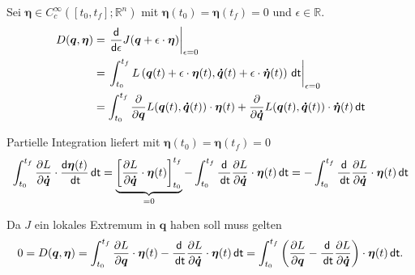 \documentclass[a4paper, 12pt]{scrartcl}
\newcommand{\dt}{\thinspace \mathsf{dt}}
\begin{document}
\begin{beweis}
    Sei $\bm{\eta} \in C_c^{\infty}\left([t_0,t_f]; \mathbb{R}^n \right)$ mit 
    $\bm{\eta}(t_0) = \bm{\eta}(t_f) = 0$ und $\epsilon \in \mathbb{R}$.
    \begin{align*}
        D(\bm{q}, \bm{\eta})
        &=
        \left. 
            \frac{\mathsf{d}}{\mathsf{d}\epsilon} J(\bm{q}+\epsilon \cdot \bm{\eta}) 
        \right|_{\epsilon=0}
        \\
        &=
        \left. 
            \int_{t_0}^{t_f} 
            L\left(
                \bm{q}(t) +\epsilon \cdot \bm{\eta}(t), 
                \bm{\dot{q}}(t)+\epsilon \cdot \bm{\dot{\eta}}(t)
            \right) 
            \dt
        \right|_{\epsilon=0}
        \\
        &=
        \int_{t_0}^{t_f} 
        \frac{\partial}{\partial \bm{q}} L(\bm{q}(t),\bm{\dot{q}}(t)) \cdot \bm{\eta}(t)
        +
        \frac{\partial}{\partial \bm{\dot{q}}} L(\bm{q}(t),\bm{\dot{q}}(t)) 
        \cdot \bm{\dot{\eta}}(t)
        \dt
    \end{align*}
    
    Partielle Integration liefert mit $\bm{\eta}(t_0) = \bm{\eta}(t_f) = 0$
    \begin{align*}
        \int_{t_0}^{t_f} 
        \frac{\partial L}{\partial \bm{\dot{q}}}
        \cdot 
        \frac{\mathsf{d}\bm{\eta}(t)}{\dt}
        \dt
        =
        \underbrace{
            \left[
                \frac{\partial L}{\partial \bm{\dot{q}}}
                \cdot
                \bm{\eta}(t)
            \right]_{t_0}^{t_f}
        }_{= 0}
        -
        \int_{t_0}^{t_f} 
        \frac{\mathsf{d}}{\dt} \frac{\partial L}{\partial \bm{\dot{q}}}
        \cdot 
        \bm{\eta}(t)
        \dt
        =
        -
        \int_{t_0}^{t_f} 
        \frac{\mathsf{d}}{\dt} \frac{\partial L}{\partial \bm{\dot{q}}}
        \cdot 
        \bm{\eta}(t)
        \dt
    \end{align*}

    Da $J$ ein lokales Extremum in $\bm{q}$ haben soll muss gelten
    \begin{align*}
        0 
        =
        D(\bm{q}, \bm{\eta})
        =
        \int_{t_0}^{t_f} 
        \frac{\partial L}{\partial \bm{q}} \cdot \bm{\eta}(t)
        -
        \frac{\mathsf{d}}{\dt} \frac{\partial L}{\partial \bm{\dot{q}}}
        \cdot 
        \bm{\eta}(t)
        \dt
        =
        \int_{t_0}^{t_f} 
        \left(
            \frac{\partial L}{\partial \bm{q}} 
            -
            \frac{\mathsf{d}}{\dt} \frac{\partial L}{\partial \bm{\dot{q}}}
        \right)
        \cdot \bm{\eta}(t)
        \dt.
    \end{align*}


\end{beweis}
\end{document}
